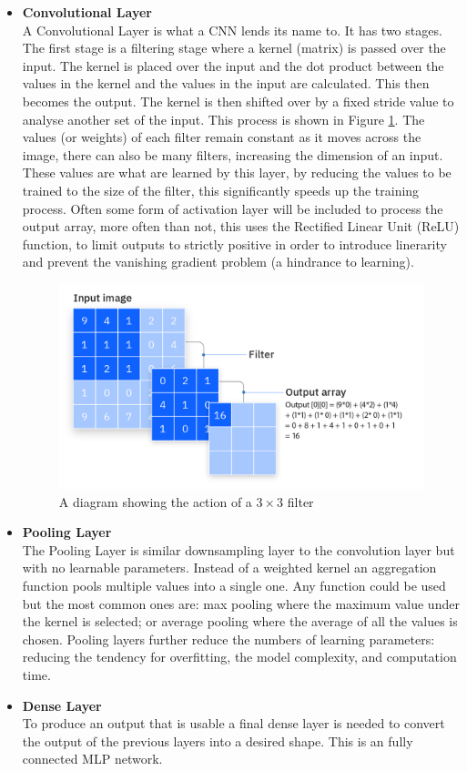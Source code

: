 \begin{itemize}
    \item \textbf{Convolutional Layer}\\
    A Convolutional Layer is what a CNN lends its name to. It has two stages. The first stage is a filtering stage where a kernel (matrix) is passed over the input. The kernel is placed over the input and the dot product between the values in the kernel and the values in the input are calculated. This then becomes the output. The kernel is then shifted over by a fixed stride value to analyse another set of the input. This process is shown in Figure \ref{fig:filter}. The values (or weights) of each filter remain constant as it moves across the image, there can also be many filters, increasing the dimension of an input. These values are what are learned by this layer, by reducing the values to be trained to the size of the filter, this significantly speeds up the training process. Often some form of activation layer will be included to process the output array, more often than not, this uses the Rectified Linear Unit (ReLU) function, to limit outputs to strictly positive in order to introduce linerarity and prevent the vanishing gradient problem (a hindrance to learning)\cite{ibmconvolutional}.
    \begin{figure}[h]
        \centering
        \includegraphics[width=0.5\linewidth]{dissertation//figures/cnn-filter.png}
        \caption{A diagram showing the action of a $3 \times 3$ filter\cite{ibmconvolutional}}
        \label{fig:filter}
    \end{figure}

    \item \textbf{Pooling Layer}\\
    The Pooling Layer is similar downsampling layer to the convolution layer but with no learnable parameters. Instead of a weighted kernel an aggregation function pools multiple values into a single one\cite{o2015introduction}. Any function could be used but the most common ones are: max pooling where the maximum value under the kernel is selected; or average pooling where the average of all the values is chosen. Pooling layers further reduce the numbers of learning parameters: reducing the tendency for overfitting, the model complexity, and computation time\cite{ibmconvolutional}.

    \item \textbf{Dense Layer}\\
    To produce an output that is usable a final dense layer is needed to convert the output of the previous layers into a desired shape. This is an fully connected MLP network.
\end{itemize}

